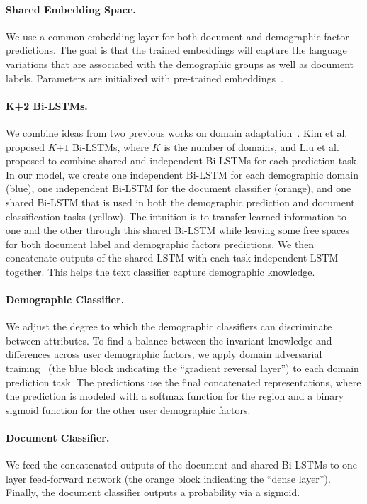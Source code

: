 \paragraph{Shared Embedding Space.} 
We use a common embedding layer for both document and demographic factor predictions. The goal is that the trained embeddings will capture the language variations that are associated with the demographic groups as well as document labels. Parameters are initialized with pre-trained  embeddings~\cite{mikolov2013distributed, pennington2014glove}.

\paragraph{K+2 Bi-LSTMs.} 
We combine ideas from two previous works on domain adaptation~\cite{liu2017adversarial, kim2017domain}. Kim et al.~\cite{kim2017domain} proposed $K$$+$$1$ Bi-LSTMs, where $K$ is the number of domains, and Liu et al.~\cite{liu2017adversarial} proposed to combine shared and independent Bi-LSTMs for each prediction task. In our model, we create one independent Bi-LSTM for each demographic domain (blue), one independent Bi-LSTM for the document classifier (orange), and one shared Bi-LSTM that is used in both the demographic prediction and document classification tasks (yellow). The intuition is to transfer learned information to one and the other through this shared Bi-LSTM while leaving some free spaces for both document label and demographic factors predictions. We then concatenate outputs of the shared LSTM with each task-independent LSTM together. This helps the text classifier capture demographic knowledge.

\paragraph{Demographic Classifier.} 
We adjust the degree to which the demographic classifiers can discriminate between attributes. 
To find a balance between the invariant knowledge and differences across user demographic factors, we apply domain adversarial training~\cite{ganin2016domain} (the blue block indicating the ``gradient reversal layer'') to each domain prediction task. The predictions use the final concatenated representations, where the prediction is modeled with a {softmax} function for the region and a binary {sigmoid} function for the other user demographic factors. 

\paragraph{Document Classifier.} 
We feed the concatenated outputs of the document and shared Bi-LSTMs to one layer feed-forward network (the orange block indicating the ``dense layer''). Finally, the document classifier outputs a probability via a sigmoid.

